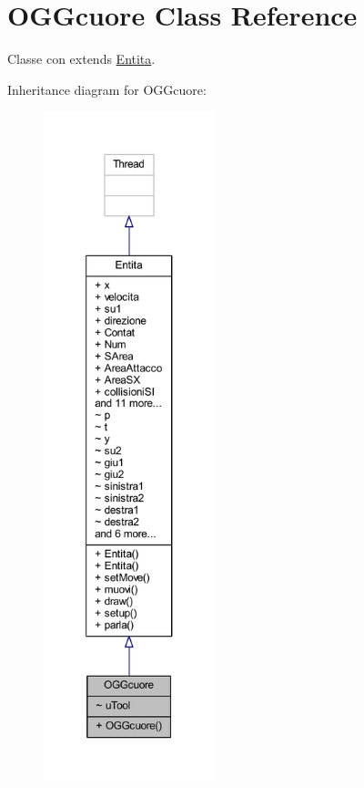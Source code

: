 \hypertarget{classoggetti_1_1_o_g_gcuore}{}\section{O\+G\+Gcuore Class Reference}
\label{classoggetti_1_1_o_g_gcuore}


Classe con extends \hyperlink{namespace_entita}{Entita}.  




Inheritance diagram for O\+G\+Gcuore\+:
\nopagebreak
\begin{figure}[H]
\begin{center}
\leavevmode
\includegraphics[height=550pt]{classoggetti_1_1_o_g_gcuore__inherit__graph}
\end{center}
\end{figure}


